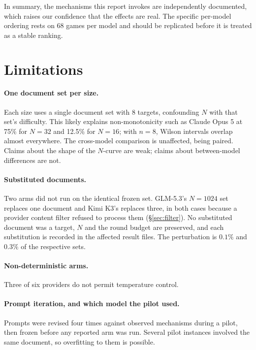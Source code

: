 \documentclass[11pt]{article}
\begin{document}
\medskip
\noindent In summary, the mechanisms this report invokes are independently documented,
which raises our confidence that the effects are real. The specific per-model
ordering rests on 68 games per model and should be replicated before it is
treated as a stable ranking.

\section{Limitations}
\label{sec:limits}

\paragraph{One document set per size.} Each size uses a single document set with
8 targets, confounding $N$ with that set's difficulty. This likely explains
non-monotonicity such as Claude Opus 5 at 75\% for $N{=}32$ and 12.5\% for $N{=}16$; with
$n=8$, Wilson intervals overlap almost everywhere. The cross-model comparison is
unaffected, being paired. Claims about the shape of the $N$-curve are weak;
claims about between-model differences are not.

\paragraph{Substituted documents.} Two arms did not run on the identical frozen
set. GLM-5.3's $N{=}1024$ set replaces one document and Kimi K3's replaces
three, in both cases because a provider content filter refused to process them
(\S\ref{sec:filter}). No substituted document was a target, $N$ and the round
budget are preserved, and each substitution is recorded in the affected result
files. The perturbation is $0.1\%$ and $0.3\%$ of the respective sets.

\paragraph{Non-deterministic arms.} Three of six providers do not permit
temperature control.

\paragraph{Prompt iteration, and which model the pilot used.} Prompts were
revised four times against observed mechanisms during a pilot, then frozen
before any reported arm was run. Several pilot instances involved the same
document, so overfitting to them is possible.
\end{document}
